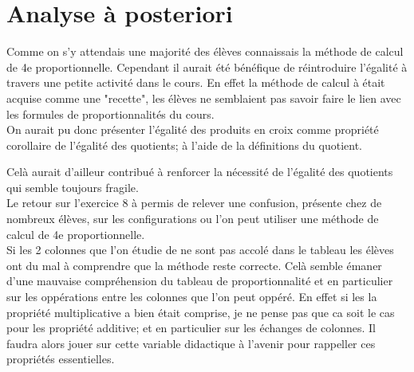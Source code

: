 \section*{Analyse à posteriori}

Comme on s'y attendais une majorité des élèves connaissais la méthode de calcul de 4e proportionnelle.
Cependant il aurait été bénéfique de réintroduire l'égalité à travers une petite activité dans le cours.
En effet la méthode de calcul à était acquise comme une "recette",
les élèves ne semblaient pas savoir faire le lien avec les formules de proportionnalités du cours.\\
On aurait pu donc présenter l'égalité des produits en croix comme propriété corollaire de l'égalité des quotients;
à l'aide de la définitions du quotient.


Celà aurait d'ailleur contribué à renforcer la nécessité de l'égalité des quotients qui semble toujours fragile.\\

Le retour sur l'exercice 8 à permis de relever une confusion,
présente chez de nombreux élèves,
sur les configurations ou l'on peut utiliser une méthode de calcul de 4e proportionnelle.\\
Si les 2 colonnes que l'on étudie de ne sont pas accolé dans le tableau les élèves ont du mal à comprendre que la méthode reste correcte.
Celà semble émaner d'une mauvaise compréhension du tableau de proportionnalité et en particulier sur les oppérations entre les colonnes que l'on peut oppéré.
En effet si les la propriété multiplicative a bien était comprise, je ne pense pas que ca soit le cas pour les propriété additive;
et en particulier sur les échanges de colonnes.
Il faudra alors jouer sur cette variable didactique à l'avenir pour rappeller ces propriétés essentielles.